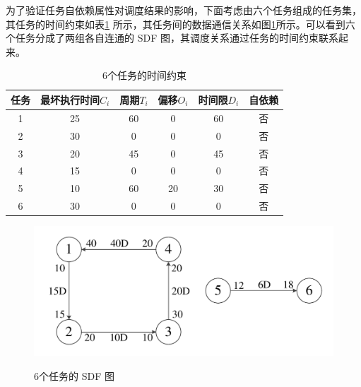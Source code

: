 为了验证任务自依赖属性对调度结果的影响，下面考虑由六个任务组成的任务集，其任务的时间约束如表\ref{EXP-table-6task-time} 所示，其任务间的数据通信关系如图\ref{EXP-fig-6task-SDF}所示。可以看到六个任务分成了两组各自连通的 SDF 图，其调度关系通过任务的时间约束联系起来。
{\renewcommand{\arraystretch}{1.5}
\begin{table}
  \centering
  \caption{6个任务的时间约束}
  \label{EXP-table-6task-time}
  \begin{tabular}{|c|c|c|c|c|c|}
    \hline
    任务 & 最坏执行时间$C_i$ & 周期$T_i$ & 偏移$O_i$ & 时间限$D_i$ & 自依赖\\
    \hline
    1 & 25 & 60 & 0 & 60 & 否\\
    2 & 30 & 0 & 0 & 0 & 否\\
    3 & 20 & 45 & 0 & 45 & 否\\
    4 & 15 & 0 & 0 & 0 & 否\\
    5 & 10 & 60 & 20 & 30 & 否\\
    6 & 30 & 0 & 0 & 0 & 否\\
    \hline
  \end{tabular}
\end{table}
}
\begin{figure}[!hbt]
  \centering
  \includegraphics[height=24ex]{figure/EXP-6task-SDF.pdf}\\
  \caption{6个任务的 SDF 图}\label{EXP-fig-6task-SDF}
\end{figure}

